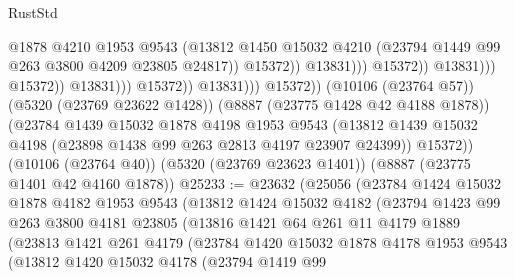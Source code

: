 \begin{lexlean}{RustStd}
\begin{coremodule}
                                                  @1878
                                                  @4210
                                                  @1953
                                                  @9543
                                                  (@13812
                                                    @1450
                                                    @15032
                                                    @4210
                                                    (@23794
                                                      @1449
                                                      @99
                                                      @263
                                                      @3800
                                                      @4209
                                                      @23805
                                                      @24817))
                                                  @15372))
                                              @13831)))
                                        @15372))
                                    @13831)))
                              @15372))
                          @13831)))
                    @15372))
                @13831)))
          @15372))
      (@10106 (@23764 @57))
      (@5320 (@23769 @23622 @1428))
      (@8887 (@23775 @1428 @42 @4188 @1878))
      (@23784
        @1439
        @15032
        @1878
        @4198
        @1953
        @9543
        (@13812 @1439 @15032 @4198 (@23898 @1438 @99 @263 @2813 @4197 @23907 @24399))
        @15372))
    (@10106 (@23764 @40))
    (@5320 (@23769 @23623 @1401))
    (@8887 (@23775 @1401 @42 @4160 @1878))
@25233 := @23632
    (@25056
      (@23784
        @1424
        @15032
        @1878
        @4182
        @1953
        @9543
        (@13812
          @1424
          @15032
          @4182
          (@23794
            @1423
            @99
            @263
            @3800
            @4181
            @23805
            (@13816
              @1421
              @64
              @261
              @11
              @4179
              @1889
              (@23813
                @1421
                @261
                @4179
                (@23784
                  @1420
                  @15032
                  @1878
                  @4178
                  @1953
                  @9543
                  (@13812
                    @1420
                    @15032
                    @4178
                    (@23794
                      @1419
                      @99

\end{coremodule}
\end{lexlean}
